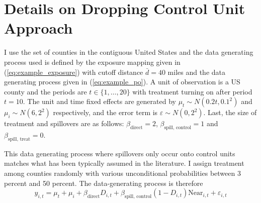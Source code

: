 \documentclass[11pt]{article}
\begin{document}
\section{Details on Dropping Control Unit Approach}
\label{sec:monte_carlo}
\setcounter{figure}{0}
\setcounter{table}{0}

I use the set of counties in the contiguous United States and the data generating process used is defined by the exposure mapping given in (\ref{eq:example_exposure}) with cutoff distance $\bar{d} = 40$ miles and the data generating process given in (\ref{eq:example_po}). A unit of observation is a US county and the periods are $t \in \{1, \dots, 20\}$ with treatment turning on after period $t = 10$. The unit and time fixed effects are generated by $\mu_t \sim N(0.2t, 0.1^2)$ and $\mu_i \sim N(6, 2^2)$ respectively, and the error term is $\varepsilon \sim N(0, 2^2)$. Last, the size of treatment and spillovers are as follows: $\beta_{\text{direct}} = 2$, $\beta_{\text{spill, control}} = 1$ and $\beta_{\text{spill, treat}} = 0$.

This data generating process where spillovers only occur onto control units matches what has been typically assumed in the literature. I assign treatment among counties randomly with various unconditional probabilities between 3 percent and 50 percent. The data-generating process is therefore 
\begin{equation}
    \label{eq:dgp1} 
    y_{i,t} = \mu_t + \mu_i + \beta_{\text{direct}} D_{i,t} + \beta_{\text{spill, control}} (1-D_{i,t}) \text{Near}_{i,t} + \varepsilon_{i,t}   
\end{equation}
\end{document}
